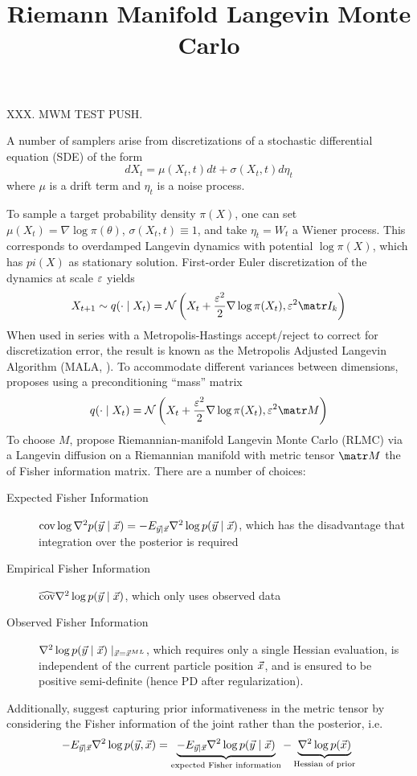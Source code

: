 \documentclass{scrartcl}
\title{Riemann Manifold Langevin Monte Carlo}
\begin{document}
\maketitle

XXX.  MWM TEST PUSH.

A number of samplers arise from discretizations of a stochastic differential equation (SDE) of the form
\[
    dX_t = \mu(X_t, t) dt + \sigma(X_t, t) d\eta_t
\]
where $\mu$ is a drift term and $\eta_t$ is a noise process.

To sample a target probability density $\pi(X)$, one can set $\mu(X_t) =
    \nabla \log \pi(\theta)$, $\sigma(X_t, t) \equiv 1$, and take $\eta_t = W_t$
a Wiener process. This corresponds to overdamped Langevin dynamics with potential $\log \pi(X)$,
which has $pi(X)$ as stationary solution. First-order Euler discretization of the dynamics
at scale $\varepsilon$ yields
\[
    X_{t+1} \sim q(\cdot\mid X_t) = \cN\left(
    X_t + \frac{\eps^2}{2} \nabla \log \pi(X_t),
    \eps^2 \mI_k
    \right)
\]
When used in series with a Metropolis-Hastings accept/reject to correct for discretization error,
the result is known as the Metropolis Adjusted Langevin Algorithm (MALA, \cite{robert1996exponential}).
To accommodate  different variances between dimensions, \cite{roberts2002langevin} proposes using a
preconditioning ``mass'' matrix
\[
    q(\cdot\mid X_t) = \cN\left(
    X_t + \frac{\eps^2}{2} \nabla \log \pi(X_t),
    \eps^2 \mM
    \right)
\]
To choose $M$, \cite{roberts2002langevin} propose Riemannian-manifold
Langevin Monte Carlo (RLMC) via a Langevin diffusion on a Riemannian manifold
with metric tensor $\mM$ the of Fisher information matrix.
There are a number of choices:
\begin{description}
    \item[Expected Fisher Information] $\operatorname*{cov} \log \nabla^2 p(\vec{y} \mid \vec{x}) = -E_{\vec{y} \mid \vec{x}} \nabla^2 \log p(\vec{y} \mid \vec{x})$, which has the disadvantage that integration over the posterior is required
    \item[Empirical Fisher Information] $\widehat{\operatorname*{cov}} \nabla^2 \log p(\vec{y} \mid \vec{x})$, which only uses observed data
    \item[Observed Fisher Information] $\nabla^2 \log p(\vec{y} \mid \vec{x}) \mid_{\vec{x} = \vec{x}^{ML}}$, which requires only a single Hessian evaluation, is independent of the current particle position $\vec{x}$, and is ensured to be positive semi-definite (hence PD after regularization).
\end{description}
Additionally, \cite{roberts2002langevin} suggest capturing prior informativeness in the metric tensor
by considering the Fisher information of the joint rather than the posterior, i.e.
\[
    -E_{\vec{y} \mid \vec{x}} \nabla^2 \log p(\vec{y}, \vec{x})
    = \underbrace{-E_{\vec{y} \mid \vec{x}} \nabla^2 \log p(\vec{y} \mid \vec{x})}_{\text{expected Fisher information}} - \underbrace{\nabla^2 \log p(\vec{x})}_{\text{Hessian of prior}}
\]
\end{document}
